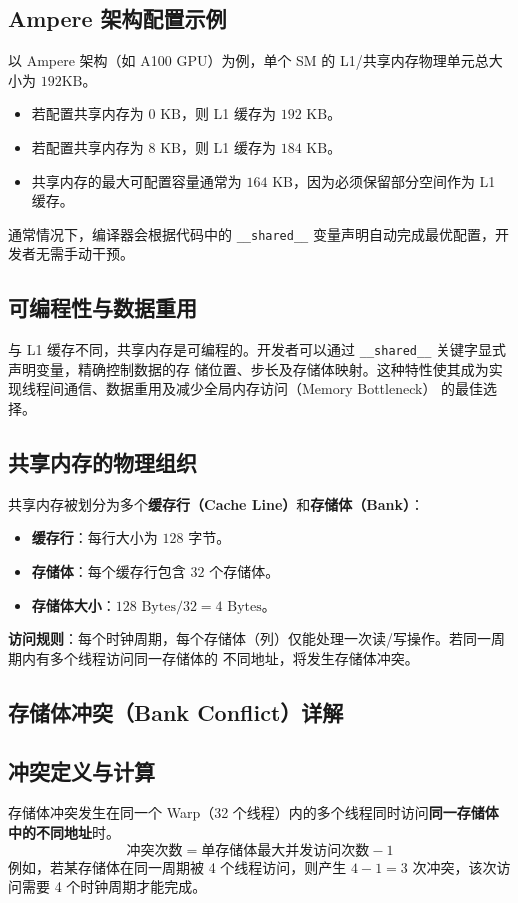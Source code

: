 \subsection{Ampere 架构配置示例}
以 Ampere 架构（如 A100 GPU）为例，单个 SM 的 L1/共享内存物理单元总大小为 $192\text{KB}$。
\begin{itemize}
    \item 若配置共享内存为 $0\text{ KB}$，则 L1 缓存为 $192\text{ KB}$。
    \item 若配置共享内存为 $8\text{ KB}$，则 L1 缓存为 $184\text{ KB}$。
    \item 共享内存的最大可配置容量通常为 $164\text{ KB}$，因为必须保留部分空间作为 L1 缓存。
\end{itemize}
通常情况下，编译器会根据代码中的 \texttt{\_\_shared\_\_} 变量声明自动完成最优配置，开发者无需手动干预。

\subsection{可编程性与数据重用}
与 L1 缓存不同，共享内存是可编程的。开发者可以通过 \texttt{\_\_shared\_\_} 关键字显式声明变量，精确控制数据的存
储位置、步长及存储体映射。这种特性使其成为实现线程间通信、数据重用及减少全局内存访问（Memory Bottleneck）
的最佳选择。

\subsection{共享内存的物理组织}
共享内存被划分为多个\textbf{缓存行（Cache Line）}和\textbf{存储体（Bank）}：
\begin{itemize}
    \item \textbf{缓存行}：每行大小为 $128$ 字节。
    \item \textbf{存储体}：每个缓存行包含 $32$ 个存储体。
    \item \textbf{存储体大小}：$128 \text{ Bytes} / 32 = 4 \text{ Bytes}$。
\end{itemize}
\textbf{访问规则}：每个时钟周期，每个存储体（列）仅能处理一次读/写操作。若同一周期内有多个线程访问同一存储体的
不同地址，将发生存储体冲突。

\subsection{存储体冲突（Bank Conflict）详解}

\subsection{冲突定义与计算}
存储体冲突发生在同一个 Warp（32 个线程）内的多个线程同时访问\textbf{同一存储体中的不同地址}时。
\begin{equation}
    \text{冲突次数} = \text{单存储体最大并发访问次数} - 1
\end{equation}
例如，若某存储体在同一周期被 4 个线程访问，则产生 $4 - 1 = 3$ 次冲突，该次访问需要 4 个时钟周期才能完成。

